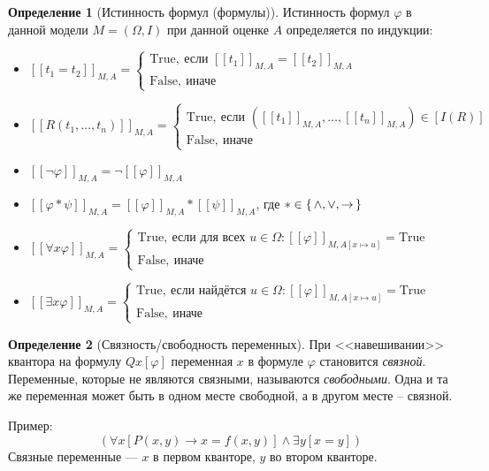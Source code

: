 \documentclass[12pt]{article}
\let\im\rightarrow
\let\n\neg
\theoremstyle{definition}
\newtheorem{definition}{Определение}[section]
\theoremstyle{plain}
\theoremstyle{remark}
\begin{document}
\begin{definition}[Истинность формул (формулы)]
  Истинность формул $\varphi$ в данной модели $M = (\Omega, I)$ при
  данной оценке $A$ определяется по индукции:
  \begin{itemize}
    \item $[[t_1 = t_2]]_{M,A} =
      \begin{cases}
        \mathrm{True},\ \text{если $[[t_1]]_{M,A} = [[t_2]]_{M,A}$}\\
        \mathrm{False},\ \text{иначе}
      \end{cases}$

    \item $[[R(t_1, \dots, t_n)]]_{M,A} =
      \begin{cases}
        \mathrm{True},\ \text{если $([[t_1]]_{M,A}, \dots,
        [[t_n]]_{M,A}) \in [I(R)]$}\\
        \mathrm{False},\ \text{иначе}
      \end{cases}$

    \item $[[\n \varphi]]_{M,A} = \n [[\varphi]]_{M,A}$

    \item $[[\varphi * \psi]]_{M,A} = [[\varphi]]_{M,A} *
      [[\psi]]_{M,A}$, где $* \in \set{\land, \lor, \im}$

    \item $[[\forall x\varphi]]_{M,A} =
      \begin{cases}
        \mathrm{True},\ \text{если для всех $u \in \Omega \colon
        [[\varphi]]_{M,A[x \mapsto u]} = \mathrm{True}$}\\
        \mathrm{False},\ \text{иначе}
      \end{cases}$

    \item $[[\exists x\varphi]]_{M,A} =
      \begin{cases}
        \mathrm{True},\ \text{если найдётся $u \in \Omega \colon
        [[\varphi]]_{M,A[x \mapsto u]} = \mathrm{True}$}\\
        \mathrm{False},\ \text{иначе}
      \end{cases}$
  \end{itemize}
\end{definition}

\begin{definition}[Связность/свободность переменных]
  При <<навешивании>> квантора на формулу $Qx[\varphi]$ переменная $x$ в
  формуле $\varphi$ становится \textit{связной}. Переменные, которые не
  являются связными, называются \textit{свободными}. Одна и та же
  переменная может быть в одном месте свободной, а в другом месте -- связной.

  Пример:
  \[
    (\forall x[P(x, y) \im x = f(x, y)] \land \exists y[x = y])
  \]
  Связные переменные --- $x$ в первом кванторе, $y$ во втором кванторе.
\end{definition}
\end{document}
